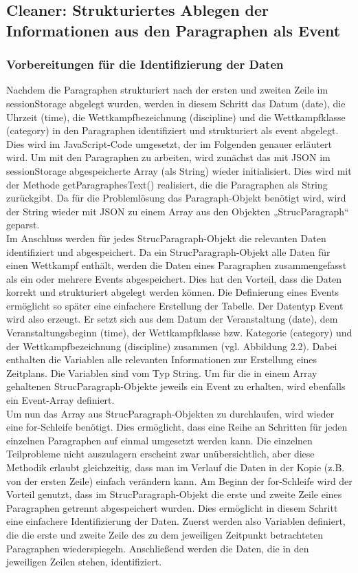 \subsection{Cleaner: Strukturiertes Ablegen der Informationen aus den Paragraphen als Event}

\subsubsection{Vorbereitungen für die Identifizierung der Daten}
Nachdem die Paragraphen strukturiert nach der ersten und zweiten Zeile im sessionStorage abgelegt wurden, werden in diesem Schritt das Datum (date), die Uhrzeit (time), die Wettkampfbezeichnung (discipline) und die Wettkampfklasse (category) in den Paragraphen identifiziert und strukturiert als event abgelegt.\\
Dies wird im JavaScript-Code umgesetzt, der im Folgenden genauer erläutert wird. Um mit den Paragraphen zu arbeiten, wird zunächst das mit JSON im sessionStorage abgespeicherte Array (als String) wieder initialisiert. Dies wird mit der Methode getParagraphesText() realisiert, die die Paragraphen als String zurückgibt. Da für die Problemlösung das Paragraph-Objekt benötigt wird, wird der String wieder mit \ac{JSON} zu einem Array aus den Objekten „StrucParagraph“ geparst.\\
Im Anschluss werden für jedes StrucParagraph-Objekt die relevanten Daten identifiziert und abgespeichert. Da ein StrucParagraph-Objekt alle Daten für einen Wettkampf enthält, werden die Daten eines Paragraphen zusammengefasst als ein oder mehrere Events abgespeichert. Dies hat den Vorteil, dass die Daten korrekt und strukturiert abgelegt werden können. Die Definierung eines Events ermöglicht so später eine einfachere Erstellung der Tabelle. Der Datentyp Event wird also erzeugt. Er setzt sich aus dem Datum der Veranstaltung (date), dem Veranstaltungsbeginn (time), der Wettkampfklasse bzw. Kategorie (category) und der Wettkampfbezeichnung (discipline) zusammen (vgl. Abbildung 2.2). Dabei enthalten die Variablen alle relevanten Informationen zur Erstellung eines Zeitplans. Die Variablen sind vom Typ String. Um für die in einem Array gehaltenen StrucParagraph-Objekte jeweils ein Event zu erhalten, wird ebenfalls ein Event-Array definiert.\\
Um nun das Array aus StrucParagraph-Objekten zu durchlaufen, wird wieder eine for-Schleife benötigt. Dies ermöglicht, dass eine Reihe an Schritten für jeden einzelnen Paragraphen auf einmal umgesetzt werden kann. Die einzelnen Teilprobleme nicht auszulagern erscheint zwar unübersichtlich, aber diese Methodik erlaubt gleichzeitig, dass man im Verlauf die Daten in der Kopie (z.B. von der ersten Zeile) einfach verändern kann. 
Am Beginn der for-Schleife wird der Vorteil genutzt, dass im StrucParagraph-Objekt die erste und zweite Zeile eines Paragraphen getrennt abgespeichert wurden. Dies ermöglicht in diesem Schritt eine einfachere Identifizierung der Daten. Zuerst werden also Variablen definiert, die die erste und zweite Zeile des zu dem jeweiligen Zeitpunkt betrachteten Paragraphen wiederspiegeln. Anschließend werden die Daten, die in den jeweiligen Zeilen stehen, identifiziert.

